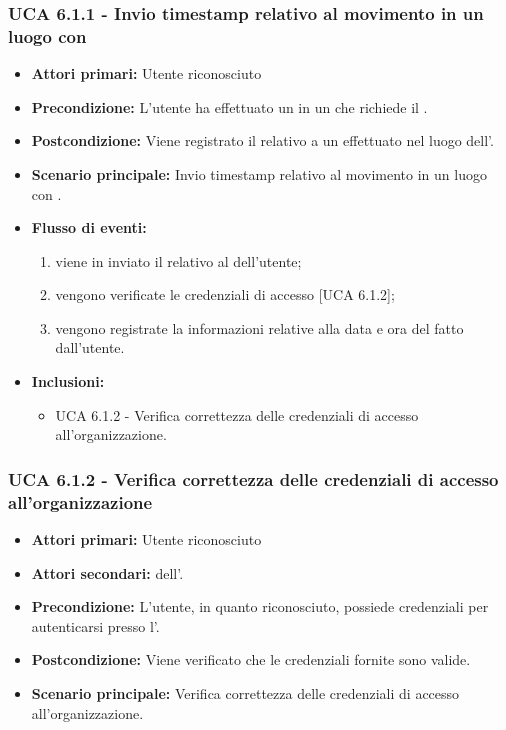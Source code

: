 \subsubsection{UCA 6.1.1 - Invio timestamp relativo al movimento in un luogo con }
\begin{itemize}
	\item \textbf{Attori primari:} Utente riconosciuto
	\item \textbf{Precondizione:} L'utente ha effettuato un  in un  che richiede il .
	\item \textbf{Postcondizione:} Viene registrato il  relativo a un  effettuato nel luogo dell'.
	\item \textbf{Scenario principale:} Invio timestamp relativo al movimento in un luogo con .
	\item \textbf{Flusso di eventi:}
		\begin{enumerate}
			\item viene in inviato il  relativo al  dell'utente;
			\item vengono verificate le credenziali di accesso [UCA 6.1.2];
			\item vengono registrate la informazioni relative alla data e ora del  fatto dall'utente.
		\end{enumerate}
	\item \textbf{Inclusioni:}
		\begin{itemize}
			\item UCA 6.1.2 - Verifica correttezza delle credenziali di accesso all'organizzazione.
		\end{itemize}
\end{itemize}

\subsubsection{UCA 6.1.2 - Verifica correttezza delle credenziali di accesso all'organizzazione}
\begin{itemize}
	\item \textbf{Attori primari:} Utente riconosciuto
	\item \textbf{Attori secondari:}  dell'.
	\item \textbf{Precondizione:} L'utente, in quanto riconosciuto, possiede credenziali per autenticarsi presso l'.
	\item \textbf{Postcondizione:} Viene verificato che le credenziali fornite sono valide.
	\item \textbf{Scenario principale:} Verifica correttezza delle credenziali di accesso all'organizzazione.
\end{itemize}

